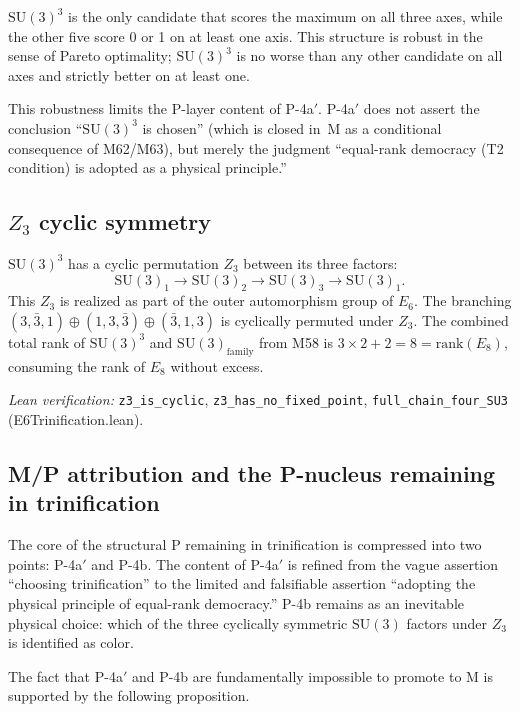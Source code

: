 \documentclass[sn-mathphys-num,Numbered]{sn-jnl}
\theoremstyle{thmstyleone}
\theoremstyle{thmstylethree}
\newcommand{\SU}{\mathrm{SU}}
\newcommand{\rank}{\mathrm{rank}}
\begin{document}
$\SU(3)^3$ is the only candidate that scores the maximum on all three axes,
while the other five score 0 or 1 on at least one axis.  This structure is
robust in the sense of Pareto optimality; $\SU(3)^3$ is no worse than any
other candidate on all axes and strictly better on at least one.

This robustness limits the P-layer content of P-4a$'$.  P-4a$'$ does not
assert the conclusion ``$\SU(3)^3$ is chosen'' (which is closed in~M as a
conditional consequence of M62/M63), but merely the judgment ``equal-rank
democracy (T2 condition) is adopted as a physical principle.''


\subsection{$Z_3$ cyclic symmetry}\label{sec:Z3}

$\SU(3)^3$ has a cyclic permutation $Z_3$ between its three factors:
\begin{equation}\label{eq:Z3}
  \SU(3)_1 \to \SU(3)_2 \to \SU(3)_3 \to \SU(3)_1.
\end{equation}
This $Z_3$ is realized as part of the outer automorphism group of $E_6$.  The
branching $(3,\bar{3},1) \oplus (1,3,\bar{3}) \oplus (\bar{3},1,3)$ is
cyclically permuted under $Z_3$.  The combined total rank of $\SU(3)^3$ and
$\SU(3)_{\mathrm{family}}$ from M58 is $3 \times 2 + 2 = 8 = \rank(E_8)$,
consuming the rank of $E_8$ without excess.

\noindent\textit{Lean verification:}
\texttt{z3\_is\_cyclic}, \texttt{z3\_has\_no\_fixed\_point},
\texttt{full\_chain\_four\_SU3} (E6Trinification.lean).


\subsection{M/P attribution and the P-nucleus remaining in trinification}\label{sec:P-nucleus}

The core of the structural P remaining in trinification is compressed into two
points: P-4a$'$ and P-4b.  The content of P-4a$'$ is refined from the vague
assertion ``choosing trinification'' to the limited and falsifiable assertion
``adopting the physical principle of equal-rank democracy.''  P-4b remains as
an inevitable physical choice: which of the three cyclically symmetric
$\SU(3)$ factors under $Z_3$ is identified as color.

The fact that P-4a$'$ and P-4b are fundamentally impossible to promote to M is
supported by the following proposition.
\end{document}
